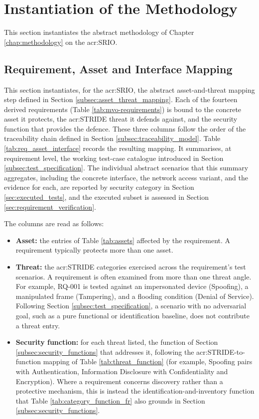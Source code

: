 \section{Instantiation of the Methodology} 
\label{sec:instantiation} 

This section instantiates the abstract methodology of Chapter \ref{chap:methodology} on the \gls{acr:SRIO}.

\subsection{Requirement, Asset and Interface Mapping}
\label{subsec:req_asset_interface}

This section instantiates, for the \gls{acr:SRIO}, the abstract asset-and-threat mapping step defined in Section \ref{subsec:asset_threat_mapping}. Each of the fourteen derived requirements (Table \ref{tab:mvo-requirements}) is bound to the concrete asset it protects, the \gls{acr:STRIDE} threat it defends against, and the security function that provides the defence. These three columns follow the order of the traceability chain defined in Section \ref{subsec:traceability_model}. Table \ref{tab:req_asset_interface} records the resulting mapping. It summarises, at requirement level, the working test-case catalogue introduced in Section \ref{subsec:test_specification}. The individual abstract scenarios that this summary aggregates, including the concrete interface, the network access variant, and the evidence for each, are reported by security category in Section \ref{sec:executed_tests}, and the executed subset is assessed in Section \ref{sec:requirement_verification}.

The columns are read as follows:
\begin{itemize}
	\item \textbf{Asset:} the entries of Table \ref{tab:assets} affected by the requirement. A requirement typically protects more than one asset.
	\item \textbf{Threat:} the \gls{acr:STRIDE} categories exercised across the requirement's test scenarios. A requirement is often examined from more than one threat angle. For example, RQ-001 is tested against an impersonated device (Spoofing), a manipulated frame (Tampering), and a flooding condition (Denial of Service). Following Section \ref{subsec:test_specification}, a scenario with no adversarial goal, such as a pure functional or identification baseline, does not contribute a threat entry.
	\item \textbf{Security function:} for each threat listed, the function of Section \ref{subsec:security_functions} that addresses it, following the \gls{acr:STRIDE}-to-function mapping of Table \ref{tab:threat_function} (for example, Spoofing pairs with Authentication, Information Disclosure with Confidentiality and Encryption). Where a requirement concerns discovery rather than a protective mechanism, this is instead the identification-and-inventory function that Table \ref{tab:category_function_fr} also grounds in Section \ref{subsec:security_functions}.
\end{itemize}

